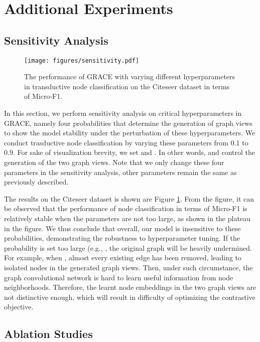 \documentclass{article}
\theoremstyle{remark}
\begin{document}
\section{Additional Experiments}
\label{appendix:experiments}

\subsection{Sensitivity Analysis}
\label{appendix:sensitivity}

\begin{figure}[b]
	\centering
	\texttt{[image: figures/sensitivity.pdf]}
	\caption{The performance of GRACE with varying different hyperparameters in transductive node classification on the Citeseer dataset in terms of Micro-F1.}
	\label{fig:sensitivity-analysis}
\end{figure}

In this section, we perform sensitivity analysis on critical hyperparameters in GRACE, namely four probabilities  that determine the generation of graph views to show the model stability under the perturbation of these hyperparameters.
We conduct trasductive node classification by varying these parameters from 0.1 to 0.9. For sake of visualization brevity, we set  and . In other words,  and  control the generation of the two graph views. Note that we only change these four parameters in the sensitivity analysis, other parameters remain the same as previously described.

The results on the Citeseer dataset is shown are Figure \ref{fig:sensitivity-analysis}.
From the figure, it can be observed that the performance of node classification in terms of Micro-F1 is relatively stable when the parameters are not too large, as shown in the plateau in the figure. We thus conclude that overall, our model is insensitive to these probabilities, demonstrating the robustness to hyperparameter tuning.
If the probability is set too large (e.g., , the original graph will be heavily undermined. For example, when , almost every existing edge has been removed, leading to isolated nodes in the generated graph views. Then, under such circumstance, the graph convolutional network is hard to learn useful information from node neighborhoods. Therefore, the learnt node embeddings in the two graph views are not distinctive enough, which will result in difficulty of optimizing the contrastive objective.

\subsection{Ablation Studies}
\label{appendix:ablation}
\end{document}
